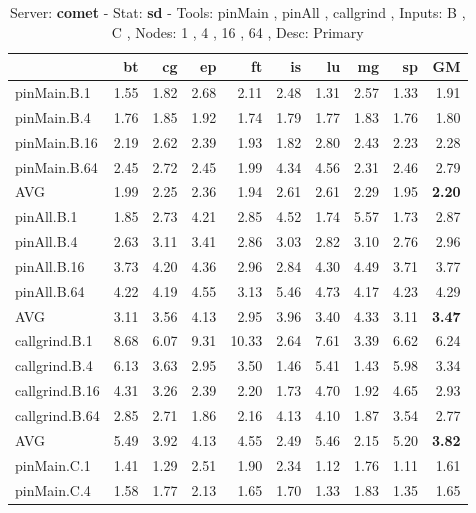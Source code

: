 \begin{table*}[]
\caption{Server: \textbf{comet} - 
 Stat: \textbf{sd} - 
 Tools: pinMain , pinAll , callgrind ,  
 Inputs: B , C ,  
 Nodes: 1 , 4 , 16 , 64 ,  
 Desc: Primary}
\label{comet_sd_pMpAcg_BC_itn_p3.5}\begin{center}
\begin{tabular}{|l|rrrrrrrr|r|}
\hline
                &   bt &   cg &    ep &    ft &   is &   lu &   mg &   sp &   GM \\
\hline
 pinMain.B.1    & 1.55 & 1.82 &  2.68 &  2.11 & 2.48 & 1.31 & 2.57 & 1.33 & 1.91 \\
 pinMain.B.4    & 1.76 & 1.85 &  1.92 &  1.74 & 1.79 & 1.77 & 1.83 & 1.76 & 1.80 \\
 pinMain.B.16   & 2.19 & 2.62 &  2.39 &  1.93 & 1.82 & 2.80 & 2.43 & 2.23 & 2.28 \\
 pinMain.B.64   & 2.45 & 2.72 &  2.45 &  1.99 & 4.34 & 4.56 & 2.31 & 2.46 & 2.79 \\
 \hline
 AVG            & 1.99 & 2.25 &  2.36 &  1.94 & 2.61 & 2.61 & 2.29 & 1.95 & \textbf{2.20} \\
 \hline
 pinAll.B.1     & 1.85 & 2.73 &  4.21 &  2.85 & 4.52 & 1.74 & 5.57 & 1.73 & 2.87 \\
 pinAll.B.4     & 2.63 & 3.11 &  3.41 &  2.86 & 3.03 & 2.82 & 3.10 & 2.76 & 2.96 \\
 pinAll.B.16    & 3.73 & 4.20 &  4.36 &  2.96 & 2.84 & 4.30 & 4.49 & 3.71 & 3.77 \\
 pinAll.B.64    & 4.22 & 4.19 &  4.55 &  3.13 & 5.46 & 4.73 & 4.17 & 4.23 & 4.29 \\
 \hline
 AVG            & 3.11 & 3.56 &  4.13 &  2.95 & 3.96 & 3.40 & 4.33 & 3.11 & \textbf{3.47} \\
 \hline
 callgrind.B.1  & 8.68 & 6.07 &  9.31 & 10.33 & 2.64 & 7.61 & 3.39 & 6.62 & 6.24 \\
 callgrind.B.4  & 6.13 & 3.63 &  2.95 &  3.50 & 1.46 & 5.41 & 1.43 & 5.98 & 3.34 \\
 callgrind.B.16 & 4.31 & 3.26 &  2.39 &  2.20 & 1.73 & 4.70 & 1.92 & 4.65 & 2.93 \\
 callgrind.B.64 & 2.85 & 2.71 &  1.86 &  2.16 & 4.13 & 4.10 & 1.87 & 3.54 & 2.77 \\
 \hline
 AVG            & 5.49 & 3.92 &  4.13 &  4.55 & 2.49 & 5.46 & 2.15 & 5.20 & \textbf{3.82} \\
 \hline
  \hline
 pinMain.C.1    & 1.41 & 1.29 &  2.51 &  1.90 & 2.34 & 1.12 & 1.76 & 1.11 & 1.61 \\
 pinMain.C.4    & 1.58 & 1.77 &  2.13 &  1.65 & 1.70 & 1.33 & 1.83 & 1.35 & 1.65 \\

\end{tabular}
\end{center}
\end{table*}
